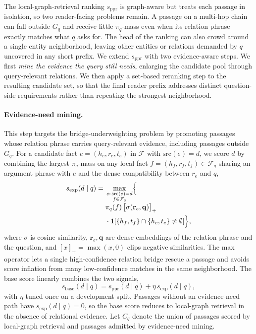 The local-graph-retrieval ranking $s_{\mathrm{ppr}}$ is graph-aware
but treats each passage in isolation, so two reader-facing problems
remain. A passage on a multi-hop chain can fall outside $G_q$ and
receive little $\pi_q$-mass even when its relation phrase exactly
matches what $q$ asks for. The head of the ranking can also crowd
around a single entity neighborhood, leaving other entities or
relations demanded by $q$ uncovered in any short prefix. We
extend $s_{\mathrm{ppr}}$ with two evidence-aware steps. We first
\emph{mine the evidence the query still needs}, enlarging the
candidate pool through query-relevant relations. We then apply a
set-based reranking step to the resulting candidate set, so that
the final reader prefix addresses distinct question-side
requirements rather than repeating the strongest neighborhood.

\paragraph{Evidence-need mining.}
This step targets the bridge-underweighting problem by promoting
passages whose relation phrase carries query-relevant evidence,
including passages outside $G_q$. For a candidate fact
$e=(h_e, r_e, t_e)$ in $\mathcal{F}$ with $\mathrm{src}(e)=d$, we
score $d$ by combining the largest $\pi_q$-mass on any local fact
$f=(h_f, r_f, t_f) \in \mathcal{F}_q$ sharing an argument phrase
with $e$ and the dense compatibility between $r_e$ and $q$,
\begin{equation}
\label{eq:expansion-score}
\begin{aligned}
s_{\mathrm{exp}}(d \mid q)
= {}& \max_{\substack{e:\,\mathrm{src}(e)=d \\ f \in \mathcal{F}_q}}
\Bigl\{\\[-0.3em]
&\pi_q(f)\,\bigl[\sigma(\mathbf{r}_e,\mathbf{q})\bigr]_{+}\\
&{}\cdot\mathbf{1}\!\left[
\{h_f,t_f\}\cap\{h_e,t_e\}\neq\emptyset
\right]\Bigr\},
\end{aligned}
\end{equation}
where $\sigma$ is cosine similarity, $\mathbf{r}_e, \mathbf{q}$ are
dense embeddings of the relation phrase and the question, and
$[x]_{+}=\max(x,0)$ clips negative similarities. The max operator
lets a single high-confidence relation bridge rescue a passage and
avoids score inflation from many low-confidence matches in the
same neighborhood. The base score linearly combines the two
signals,
\begin{equation}
\label{eq:base-score}
s_{\mathrm{base}}(d \mid q)
=
s_{\mathrm{ppr}}(d \mid q)
+
\eta\,s_{\mathrm{exp}}(d \mid q),
\end{equation}
with $\eta$ tuned once on a development split. Passages without an
evidence-need path have $s_{\mathrm{exp}}(d \mid q)=0$, so the base
score reduces to local-graph retrieval in the absence of
relational evidence. Let $C_q$ denote the union of passages scored
by local-graph retrieval and passages admitted by evidence-need
mining.

